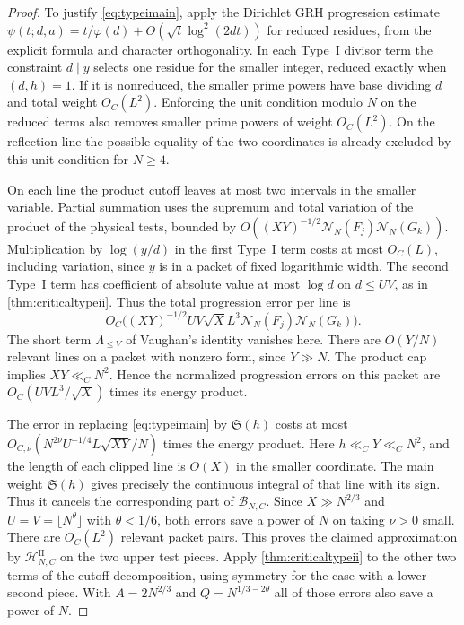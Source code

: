 \documentclass[11pt,a4paper]{article}
\numberwithin{equation}{section}
\newcommand{\SSS}{\mathfrak S}
\newcommand{\NN}{\mathcal N_N}
\begin{document}
\begin{proof}
To justify \cref{eq:typeimain}, apply the Dirichlet GRH
progression estimate
$\psi(t;d,a)=t/\varphi(d)+O(\sqrt t\log^2(2dt))$
for reduced residues, from the explicit formula and
character orthogonality. In each Type~I divisor term
the constraint $d\mid y$ selects one residue for the
smaller integer, reduced exactly when $(d,h)=1$.
If it is nonreduced, the smaller prime powers have
base dividing $d$ and total weight $O_C(L^2)$.
Enforcing the unit condition modulo $N$ on the reduced
terms also removes smaller prime powers of weight
$O_C(L^2)$. On the reflection line the possible equality
of the two coordinates is already excluded by this unit
condition for $N\ge4$.

On each line the product cutoff leaves at most two
intervals in the smaller variable. Partial summation
uses the supremum and total variation of the product
of the physical tests, bounded by
$O((XY)^{-1/2}\NN(F_j)\NN(G_k))$. Multiplication by
$\log(y/d)$ in the first Type~I term costs at most
$O_C(L)$, including variation, since $y$ is in a packet
of fixed logarithmic width. The second Type~I term has
coefficient of absolute value at most $\log d$ on
$d\le UV$, as in \cref{thm:criticaltypeii}. Thus the
total progression error per line is
\[
 O_C\bigl((XY)^{-1/2} UV\sqrt X L^3
                         \NN(F_j)\NN(G_k)\bigr).
\]
The short term $\Lambda_{\le V}$ of Vaughan's identity
vanishes here. There are $O(Y/N)$ relevant lines on
a packet with nonzero form, since $Y\gg N$.
The product cap implies $XY\ll_C N^2$. Hence the
normalized progression errors on this packet are
$O_C(UV L^3/\sqrt X)$ times its energy product.

The error in replacing \cref{eq:typeimain} by
$\SSS(h)$ costs at most
$O_{C,\nu}(N^{2\nu}U^{-1/4}L\sqrt{XY}/N)$ times the
energy product. Here $h\ll_C Y\ll_C N^2$, and the
length of each clipped line is $O(X)$ in the smaller
coordinate. The main weight $\SSS(h)$ gives precisely
the continuous integral of that line with its sign.
Thus it cancels the corresponding part of
$\mathcal B_{N,C}$. Since $X\gg N^{2/3}$ and
$U=V=\lfloor N^\theta\rfloor$ with $\theta<1/6$, both errors save a power
of $N$ on taking $\nu>0$ small. There are $O_C(L^2)$
relevant packet pairs. This proves the claimed
approximation by $\mathcal H^{\mathrm{II}}_{N,C}$ on
the two upper test pieces. Apply \cref{thm:criticaltypeii}
to the other two terms of the cutoff decomposition,
using symmetry for the case with a lower second piece.
With $A=2N^{2/3}$ and $Q=N^{1/3-2\theta}$ all of those errors
also save a power of $N$.
\end{proof}
\end{document}
